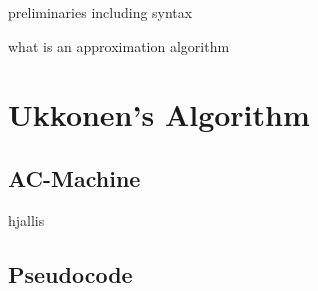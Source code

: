 \documentclass[english,twoside,censored,csm,algorithms-track-2020]{HYthesisML}
\theoremstyle{plain}
\theoremstyle{definition}
\begin{document}
  preliminaries including syntax

  what is an approximation algorithm

\chapter{Ukkonen's Algorithm}
 \listofalgorithms
  \section{AC-Machine}
  hjallis

  \section{Pseudocode}


  
\end{document}
